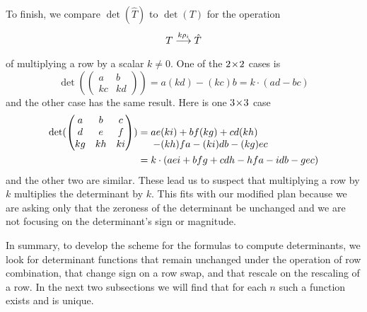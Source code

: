 To finish,
we compare \( \det(\hat{T}) \) to \( \det(T) \) for the operation
\begin{equation*}
   T \mathrel{ \mathop{\longrightarrow}\limits^{ k{\rho}_i \mathstrut}_{ \begin{subarray}{l} \relax \end{subarray}}} \hat{T}
\end{equation*}
of multiplying a row by a scalar $k\neq 0$. 
One of the $2 \! \times \! 2$ cases is
\begin{equation*}
  \det(
    \begin{pmatrix}
      a   &b   \\
      kc  &kd
    \end{pmatrix}
  )
  = a(kd) - (kc)b
  =k\cdot (ad-bc)
\end{equation*}
and the other case has the same result.
Here is one \(3 \! \times \! 3\) case
\begin{align*}
  \det(
  \begin{pmatrix}
    a    &b    &c   \\
    d    &e    &f   \\
    kg   &kh   &ki
  \end{pmatrix}
  )
   &= \begin{array}[t]{@{}l@{}}
         ae(ki) + bf(kg) + cd(kh)                \\
         \>- (kh)fa - (ki)db - (kg)ec  
      \end{array}                                      \\
   &= k\cdot(aei + bfg + cdh - hfa - idb - gec)
\end{align*}
and the other two are similar.
These lead us to suspect that multiplying a row by $k$
multiplies the determinant by $k$.
This fits 
with our modified plan because we are asking only that the
zeroness of the determinant be unchanged and we are not focusing on the
determinant's sign or magnitude.

In summary,                       
to develop the scheme for the formulas to compute determinants,
we look for determinant functions that remain unchanged
under the operation of row combination, that change sign on
a row swap, and that rescale on the rescaling of a row.
In the next two subsections we will find that for each $n$
such a function exists and is unique.

